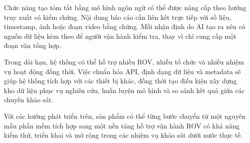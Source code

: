 \documentclass[../DoAn.tex]{subfiles}
\begin{document}
Chức năng tạo tóm tắt bằng mô hình ngôn ngữ có thể được nâng cấp theo hướng truy xuất có kiểm chứng. Nội dung báo cáo cần liên kết trực tiếp với số liệu, timestamp, ảnh hoặc đoạn video bằng chứng. Mỗi nhận định do AI tạo ra nên có nguồn dữ liệu kèm theo để người vận hành kiểm tra, thay vì chỉ cung cấp một đoạn văn tổng hợp.

Trong dài hạn, hệ thống có thể hỗ trợ nhiều ROV, nhiều tổ chức và nhiều nhiệm vụ hoạt động đồng thời. Việc chuẩn hóa API, định dạng dữ liệu và metadata sẽ giúp hệ thống tích hợp với các thiết bị khác, đồng thời tạo điều kiện xây dựng kho dữ liệu phục vụ nghiên cứu, huấn luyện mô hình và so sánh kết quả giữa các chuyến khảo sát.

Với các hướng phát triển trên, sản phẩm có thể từng bước chuyển từ một nguyên mẫu phần mềm tích hợp sang một nền tảng hỗ trợ vận hành ROV có khả năng kiểm thử, triển khai và mở rộng trong các nhiệm vụ khảo sát dưới nước thực tế.
\end{document}
